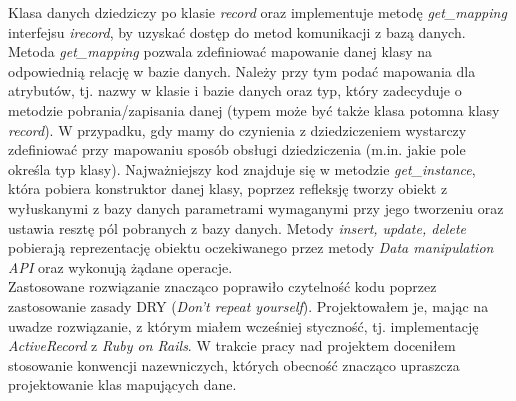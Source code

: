 \documentclass[12pt]{article}
\begin{document}
Klasa danych dziedziczy po klasie \emph{record} oraz implementuje metodę \emph{get\_mapping} interfejsu \emph{irecord}, by uzyskać dostęp do metod komunikacji z bazą danych. Metoda \emph{get\_mapping} pozwala zdefiniować mapowanie danej klasy na odpowiednią relację w bazie danych. Należy przy tym podać mapowania dla atrybutów, tj. nazwy w klasie i bazie danych oraz typ, który zadecyduje o metodzie pobrania/zapisania danej (typem może być także klasa potomna klasy \emph{record}). W przypadku, gdy mamy do czynienia z dziedziczeniem wystarczy zdefiniować przy mapowaniu sposób obsługi dziedziczenia (m.in. jakie pole określa typ klasy). Najważniejszy kod znajduje się w metodzie \emph{get\_instance}, która pobiera konstruktor danej klasy, poprzez refleksję tworzy obiekt z wyłuskanymi z bazy danych parametrami wymaganymi przy jego tworzeniu oraz ustawia resztę pól pobranych z bazy danych. Metody \emph{insert, update, delete} pobierają reprezentację obiektu oczekiwanego przez metody \emph{Data manipulation API} oraz wykonują żądane operacje.\\
Zastosowane rozwiązanie znacząco poprawiło czytelność kodu poprzez zastosowanie zasady DRY (\emph{Don't repeat yourself}). Projektowałem je, mając na uwadze rozwiązanie, z którym miałem wcześniej styczność, tj. implementację \emph{ActiveRecord} z \emph{Ruby on Rails}. W trakcie pracy nad projektem doceniłem stosowanie konwencji nazewniczych, których obecność znacząco upraszcza projektowanie klas mapujących dane.
\end{document}
